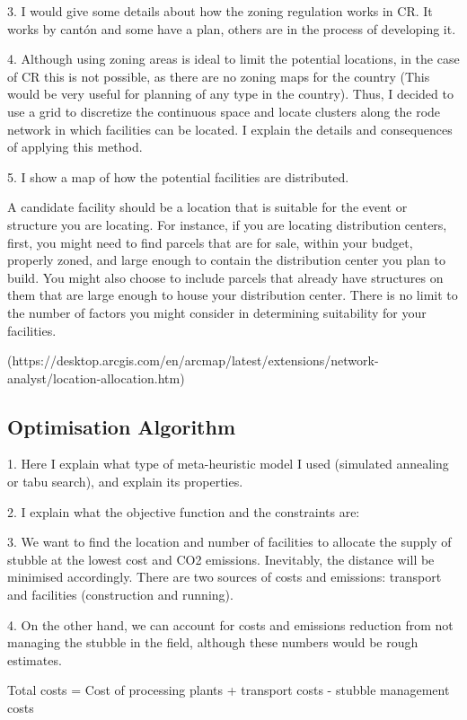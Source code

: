 3. I would give some details about how the zoning regulation works in CR. It works by cantón and some have a plan, others are in the process of developing it. 

4. Although using zoning areas is ideal to limit the potential locations, in the case of CR this is not possible, as there are no zoning maps for the country (This would be very useful for planning of any type in the country). Thus, I decided to use a grid to discretize the continuous space and locate clusters along the rode network in which facilities can be located. I explain the details and consequences of applying this method.

5. I show a map of how the potential facilities are distributed.


A candidate facility should be a location that is suitable for the event or structure you are locating. For instance, if you are locating distribution centers, first, you might need to find parcels that are for sale, within your budget, properly zoned, and large enough to contain the distribution center you plan to build. You might also choose to include parcels that already have structures on them that are large enough to house your distribution center. There is no limit to the number of factors you might consider in determining suitability for your facilities.

(https://desktop.arcgis.com/en/arcmap/latest/extensions/network-analyst/location-allocation.htm)


\subsection{Optimisation Algorithm}

1. Here I explain what type of meta-heuristic model I used (simulated annealing or tabu search), and explain its properties.

2. I explain what the objective function and the constraints are:

3. We want to find the location and number of facilities to allocate the supply of stubble at the lowest cost and CO2 emissions. Inevitably, the distance will be minimised accordingly. There are two sources of costs and emissions: transport and facilities (construction and running). 

4. On the other hand, we can account for costs and emissions reduction from not managing the stubble in the field, although these numbers would be rough estimates. 

Total costs = Cost of processing plants + transport costs - stubble management costs 

